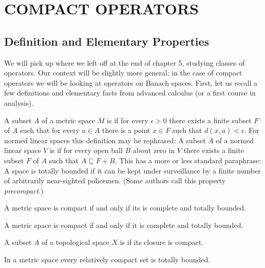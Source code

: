 \chapter{COMPACT OPERATORS}\label{chap_cpt_ops}

\section{Definition and Elementary Properties}

We will pick up where we left off at the end of chapter 5, studying classes of operators.
Our context will be slightly more general; in the case of compact operators we will be
looking at operators on Banach spaces.  First, let us recall a few definitions and
elementary facts from advanced calculus (or a first course in analysis).

\begin{defn} A subset $A$ of a metric space $M$ is
 if for every $\epsilon > 0$ there exists a finite subset $F$ of $A$
such that for every $a \in A$ there is a point $x \in F$ such that $d(x,a) < \epsilon$.
For normed linear spaces this definition may be rephrased: A subset $A$ of a normed linear
space $V$ is  if for every open ball $B$ about zero in $V$ there exists
a finite subset $F$ of $A$ such that $A \subseteq F + B$.  This has a more or less standard
paraphrase: A space is totally bounded if it can be kept under surveillance by a finite number
of arbitrarily near-sighted policemen.  (Some authors call this property \emph{precompact}.)
\end{defn}

\begin{prop} A metric space is compact if and only if its is complete and totally bounded.
\end{prop}

\begin{prop} A metric space is compact if and only if it is complete and totally bounded.
\end{prop}

\begin{defn} A subset $A$ of a topological space $X$ is
 if its closure is compact.
\end{defn}

\begin{prop} In a metric space every relatively compact set is totally bounded.
\end{prop}


